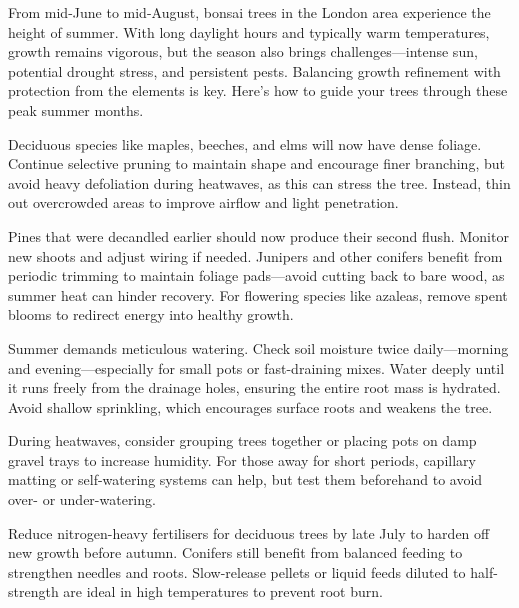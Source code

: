 \label{2025-06-care}
\noindent
From mid\--June to mid\--August, bonsai trees in the London area experience the height of summer.
With long daylight hours and typically warm temperatures, growth remains vigorous, but the season also brings challenges---intense sun, potential drought stress, and persistent pests.
Balancing growth refinement with protection from the elements is key.
Here's how to guide your trees through these peak summer months.

\medskip
{}
\noindent
Deciduous species like maples, beeches, and elms will now have dense foliage.
Continue selective pruning to maintain shape and encourage finer branching, but avoid heavy defoliation during heatwaves, as this can stress the tree.
Instead, thin out overcrowded areas to improve airflow and light penetration.

Pines that were decandled earlier should now produce their second flush.
Monitor new shoots and adjust wiring if needed.
Junipers and other conifers benefit from periodic trimming to maintain foliage pads---avoid cutting back to bare wood, as summer heat can hinder recovery.
For flowering species like azaleas, remove spent blooms to redirect energy into healthy growth.

\medskip
{}
\noindent
Summer demands meticulous watering.
Check soil moisture twice daily---morning and evening---especially for small pots or fast\--draining mixes.
Water deeply until it runs freely from the drainage holes, ensuring the entire root mass is hydrated.
Avoid shallow sprinkling, which encourages surface roots and weakens the tree.

During heatwaves, consider grouping trees together or placing pots on damp gravel trays to increase humidity.
For those away for short periods, capillary matting or self\--watering systems can help, but test them beforehand to avoid over\-- or under\--watering.

\medskip
{}
\noindent
Reduce nitrogen\--heavy fertilisers for deciduous trees by late July to harden off new growth before autumn.
Conifers still benefit from balanced feeding to strengthen needles and roots.
Slow\--release pellets or liquid feeds diluted to half\--strength are ideal in high temperatures to prevent root burn.

